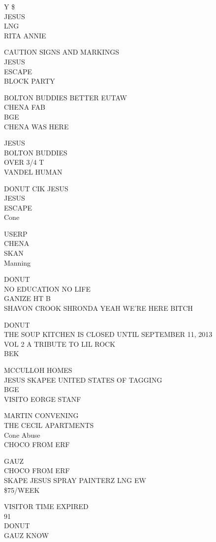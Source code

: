 \documentclass[10pt,letterpaper]{article}
\begin{document}
Y \$\\
JESUS\\
LNG\\
RITA ANNIE

CAUTION SIGNS AND MARKINGS\\
JESUS\\
ESCAPE\\
BLOCK PARTY

BOLTON BUDDIES BETTER EUTAW\\
CHENA FAB\\
BGE\\
CHENA WAS HERE

JESUS\\
BOLTON BUDDIES\\
OVER 3/4 T\\
VANDEL HUMAN

DONUT CIK JESUS\\
JESUS\\
ESCAPE\\
Cone

USERP\\
CHENA\\
SKAN\\
Manning

DONUT\\
NO EDUCATION NO LIFE\\
GANIZE HT B\\
SHAVON CROOK SHRONDA YEAH WE'RE HERE BITCH

DONUT\\
THE SOUP KITCHEN IS CLOSED UNTIL SEPTEMBER 11, 2013\\
VOL 2 A TRIBUTE TO LIL ROCK\\
BEK

MCCULLOH HOMES\\
JESUS SKAPEE UNITED STATES OF TAGGING\\
BGE\\
VISITO EORGE STANF

MARTIN CONVENING\\
THE CECIL APARTMENTS\\
Cone Abuse\\
CHOCO FROM ERF

GAUZ\\
CHOCO FROM ERF\\
SKAPE JESUS SPRAY PAINTERZ LNG EW\\
\$75/WEEK

VISITOR TIME EXPIRED\\
91\\
DONUT\\
GAUZ KNOW
\end{document}
